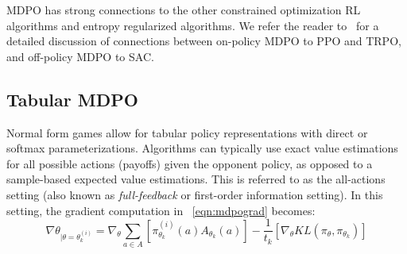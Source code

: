 




MDPO has strong connections to the other constrained optimization RL algorithms and entropy
regularized algorithms.
We refer the reader to~\cite{tomarMirror2022} for a detailed discussion of connections between
on-policy MDPO to PPO and TRPO, and off-policy MDPO to SAC.

\subsection{Tabular MDPO}
Normal form games allow for tabular policy representations with direct or softmax
parameterizations.
Algorithms can typically use exact value estimations for all possible actions (payoffs) given the
opponent policy, as opposed to a sample-based expected value estimations.
This is referred to as the all-actions setting (also known as \textit{full-feedback} or first-order
information setting).
In this setting, the gradient computation in~ \ref{eqn:mdpograd} becomes: \[ \nabla
	\theta_{|\theta=\theta_{k}^{(i)}} = \nabla_{\theta} \sum_{a \in A} [ \pi_{\theta_k}^{(i)} (a)
		A_{\theta_k}(a)] - \frac{1}{t_k} [\nabla_\theta KL(\pi_\theta, \pi_{\theta_k})] \]

